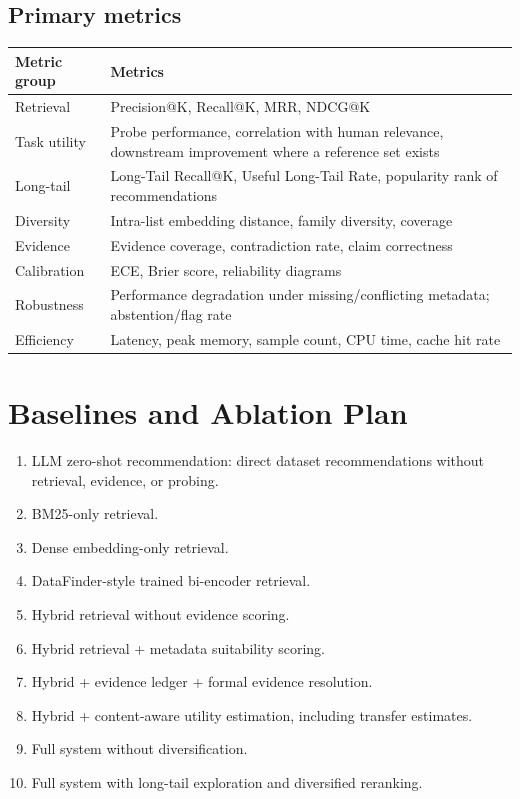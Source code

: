 \documentclass[11pt]{article}
\begin{document}
\subsection{Primary metrics}
\begin{longtable}{@{}L{2.6cm}L{10.9cm}@{}}
\toprule
\textbf{Metric group} & \textbf{Metrics} \\
\midrule
\endhead
Retrieval & Precision@K, Recall@K, MRR, NDCG@K \\
Task utility & Probe performance, correlation with human relevance, downstream improvement where a
  reference set exists \\
Long-tail & Long-Tail Recall@K, Useful Long-Tail Rate, popularity rank of recommendations \\
Diversity & Intra-list embedding distance, family diversity, coverage \\
Evidence & Evidence coverage, contradiction rate, claim correctness \\
Calibration & ECE, Brier score, reliability diagrams \\
Robustness & Performance degradation under missing/conflicting metadata; abstention/flag rate \\
Efficiency & Latency, peak memory, sample count, CPU time, cache hit rate \\
\bottomrule
\end{longtable}

\section{Baselines and Ablation Plan}
\label{sec:ablation}
\begin{enumerate}[leftmargin=*]
\item LLM zero-shot recommendation: direct dataset recommendations without retrieval, evidence, or
      probing.
\item BM25-only retrieval.
\item Dense embedding-only retrieval.
\item DataFinder-style trained bi-encoder retrieval.
\item Hybrid retrieval without evidence scoring.
\item Hybrid retrieval + metadata suitability scoring.
\item Hybrid + evidence ledger + formal evidence resolution.
\item Hybrid + content-aware utility estimation, including transfer estimates.
\item Full system without diversification.
\item Full system with long-tail exploration and diversified reranking.
\end{enumerate}
\end{document}
